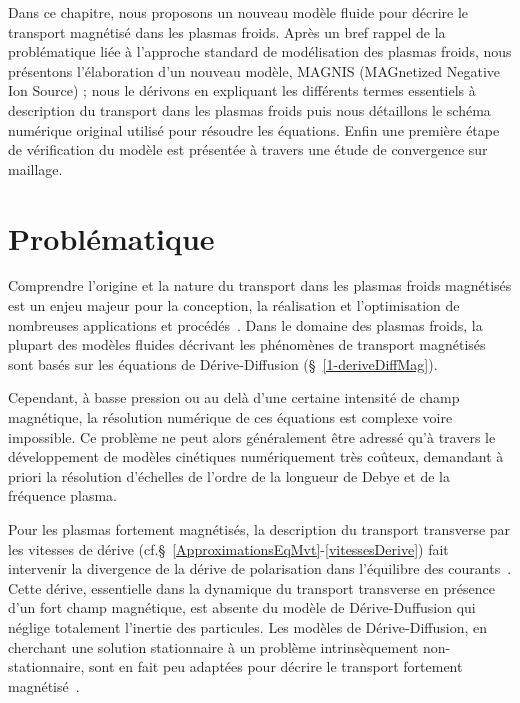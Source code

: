 \begin{refsection}


Dans ce chapitre, nous proposons un nouveau modèle fluide pour décrire le
transport magnétisé dans les plasmas froids. Après un bref rappel de
la problématique liée à l'approche standard de modélisation des plasmas froids,
nous présentons l'élaboration d'un nouveau modèle, MAGNIS (MAGnetized Negative
Ion Source) ; nous le dérivons en expliquant les différents termes
essentiels à description du transport dans les plasmas froids puis nous détaillons le
schéma numérique original utilisé pour résoudre les équations. Enfin une
première étape de vérification du modèle est présentée à travers une étude de
convergence sur maillage.

\section{Problématique}

Comprendre l'origine et la nature du transport dans les plasmas
froids magnétisés est un enjeu majeur pour la conception, la réalisation et
l'optimisation de nombreuses applications et
procédés~\parencite{Lieberman}. Dans le domaine des plasmas froids, la plupart des modèles
fluides décrivant les phénomènes de transport magnétisés sont basés sur les
équations de Dérive-Diffusion (\S~\ref{1-deriveDiffMag}).

Cependant, à basse pression ou au delà d'une
certaine intensité de champ magnétique, la résolution numérique de ces
équations est complexe voire impossible. Ce problème ne peut alors
généralement être adressé qu'à travers le développement de modèles cinétiques
numériquement très coûteux, demandant à priori la résolution d'échelles de
l'ordre de la longueur de Debye et de la fréquence plasma.

Pour les plasmas fortement magnétisés, la description du transport transverse
par les vitesses de dérive
(cf.\S~\ref{ApproximationsEqMvt}-\ref{vitessesDerive}) fait intervenir la divergence de la dérive de
polarisation dans l'équilibre des courants~\parencite{Tamain2}. Cette dérive,
essentielle dans la dynamique du transport transverse en présence d'un fort champ magnétique, est
absente du modèle de Dérive-Duffusion qui néglige totalement l'inertie des
particules.
Les modèles de Dérive-Diffusion, en cherchant une solution stationnaire à un
problème intrinsèquement non-stationnaire, sont en fait peu adaptées pour décrire le
transport fortement magnétisé~\parencite{Fruchtman,Sternberg}.


\end{refsection}
